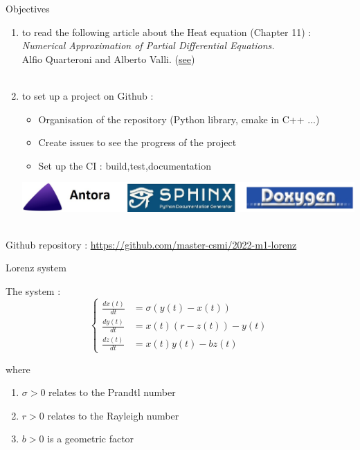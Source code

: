 \documentclass[10pt,xcolor={table,dvipsnames},t]{beamer}
\begin{document}
	\begin{frame}{Objectives}
		
		\begin{enumerate}[\textbullet]
			\item to read the following article about the Heat equation (Chapter 11) : \\ \textit{Numerical Approximation of Partial Differential Equations.} \\
			Alfio Quarteroni and Alberto Valli.    (\href{https://link.springer.com/content/pdf/10.1007/978-3-540-85268-1.pdf}{see}) \\ \; \\
			\item to set up a project on Github :
			\begin{itemize}
				\item Organisation of the repository (Python library, cmake in C++ ...)
				\item Create issues to see the progress of the project
				\item Set up the CI : build,test,documentation 
			\end{itemize}
			\includegraphics[width=\linewidth]{images/intro/logo.jpg}
		\end{enumerate} \; \\
		Github repository : \url{https://github.com/master-csmi/2022-m1-lorenz}
	
	\end{frame}
	
	\begin{frame}{Lorenz system}
		
		The system :
		$$\left\{\begin{aligned} 
			\frac{d x(t)}{d t} &=\sigma(y(t)-x(t))\\
			\frac{d y(t)}{d t}&=x(t)(r-z(t))-y(t) \\
			\frac{d z(t)}{d t}&=x(t)y(t)-bz(t)
		\end{aligned}\right.$$
	
		where
		
		\begin{enumerate}[\textbullet]
			\item $\sigma > 0$  relates to the Prandtl number
			\item $r > 0$  relates to the Rayleigh number
			\item $b > 0$ is a geometric factor
		\end{enumerate}
		
	\end{frame}
\end{document}
